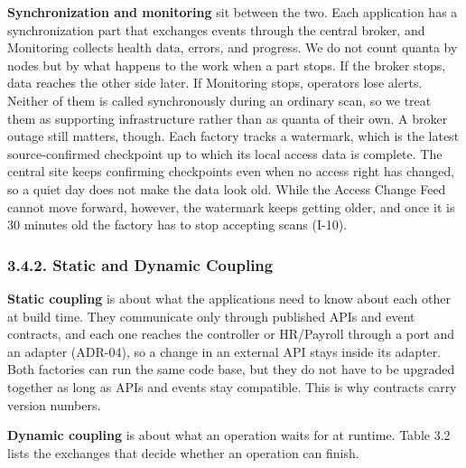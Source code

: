 \textbf{Synchronization and monitoring} sit between the two. Each application has a synchronization part that exchanges events through the central broker, and Monitoring collects health data, errors, and progress. We do not count quanta by nodes but by what happens to the work when a part stops. If the broker stops, data reaches the other side later. If Monitoring stops, operators lose alerts. Neither of them is called synchronously during an ordinary scan, so we treat them as supporting infrastructure rather than as quanta of their own. A broker outage still matters, though. Each factory tracks a watermark, which is the latest source-confirmed checkpoint up to which its local access data is complete. The central site keeps confirming checkpoints even when no access right has changed, so a quiet day does not make the data look old. While the Access Change Feed cannot move forward, however, the watermark keeps getting older, and once it is 30 minutes old the factory has to stop accepting scans (I-10).

\subsubsection*{3.4.2. Static and Dynamic Coupling}

{}

\textbf{Static coupling} is about what the applications need to know about each other at build time. They communicate only through published APIs and event contracts, and each one reaches the controller or HR/Payroll through a port and an adapter (ADR-04), so a change in an external API stays inside its adapter. Both factories can run the same code base, but they do not have to be upgraded together as long as APIs and events stay compatible. This is why contracts carry version numbers.

\textbf{Dynamic coupling} is about what an operation waits for at runtime. Table 3.2 lists the exchanges that decide whether an operation can finish.

